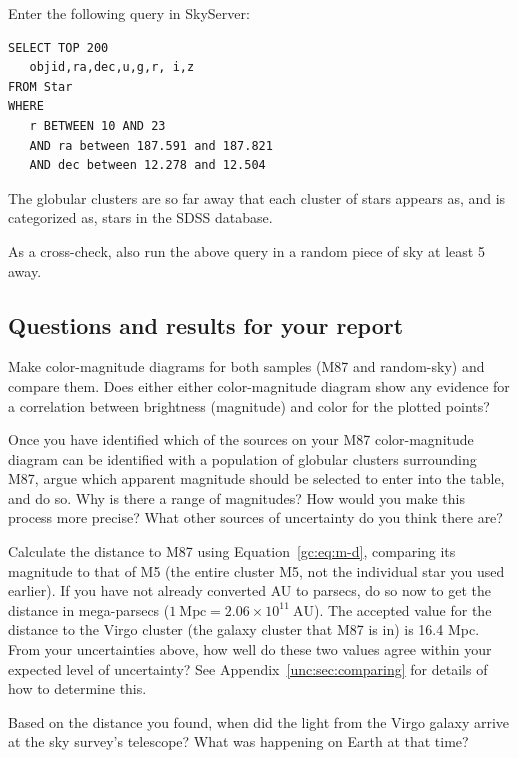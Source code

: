 \begin{steps}
	\item Enter the following query in SkyServer:

\end{steps}

\begin{verbatim}
SELECT TOP 200
   objid,ra,dec,u,g,r, i,z
FROM Star
WHERE
   r BETWEEN 10 AND 23
   AND ra between 187.591 and 187.821
   AND dec between 12.278 and 12.504
\end{verbatim}


The globular clusters are so far away that each cluster of stars appears as, and is categorized as, stars in
the SDSS database.

\begin{steps}
	\item As a cross-check, also run the above query in a random piece of sky at least
5\textdegree{} away.
\end{steps}

\subsection{Questions and results for your report}

\begin{steps}
	\item Make color-magnitude diagrams for both samples (M87 and random-sky)
	and compare them. Does either either color-magnitude diagram show any
	evidence for a correlation between brightness (magnitude) and color for the
	plotted points?
	
	\item Once you have identified which of the sources on your M87 color-magnitude
	diagram can be identified with a population of globular clusters surrounding
	M87, argue which apparent magnitude should be selected to enter into the table, and do so. Why is there a range of magnitudes? How would you make this
	process more precise? What other sources of uncertainty do you think
	there are?
	
	\item Calculate the distance to M87 using Equation~\ref{gc:eq:m-d}, comparing its magnitude to that of M5 (the entire cluster M5, not the individual star you used earlier). If you have not already converted AU to
	parsecs, do so now to get the distance in mega-parsecs ($1\:\mathrm{Mpc} = 2.06 \times
	10^{11}\:\mathrm{AU}$). The accepted value for the distance to the Virgo cluster (the galaxy cluster that M87 is in) is 16.4
	Mpc. From your uncertainties above, how well do these two values agree within your expected level
	of uncertainty? See Appendix~\ref{unc:sec:comparing} for details of how to determine this.
	
	\item Based on the distance you found, when did the light from the Virgo galaxy arrive at the sky survey's telescope? What was happening on Earth at that time?
\end{steps}

